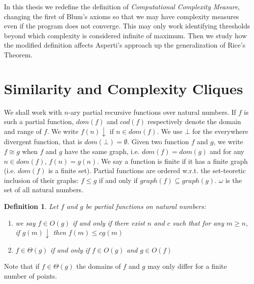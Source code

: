 \documentclass[10pt, a4paper, oneside, titlepage, draft]{article}
\newtheorem{definition}[shrd]{Definition}
\begin{document}
In this thesis we redefine the definition of \textit{Computational Complexity Measure}, changing the first of Blum's axioms so that we may have complexity measures even if the program does not converge. This may only work identifying thresholds beyond which complexity is considered infinite of maximum. Then we study how the modified definition affects Asperti's approach up the generalization of Rice's Theorem.

\section{Similarity and Complexity Cliques}
We shall work with $n$-ary partial recursive functions over natural numbers. If $f$ is such a partial function, $dom(f)$ and $cod(f)$ respectively denote the domain and range of $f$. We write $f(n)\downarrow$ if $n \in dom(f)$. We use $\bot$ for the everywhere divergent function, that is $dom(\bot) = \emptyset$. Given two function $f$ and $g$, we write $f \cong g$ when $f$ and $g$ have the same graph, i.e. $dom(f)=dom(g)$ and for any $n \in dom(f)$, $f(n)=g(n)$. We say a function is finite if it has a finite graph (i.e. $dom(f)$ is a finite set). Partial functions are ordered w.r.t. the set-teoretic inclusion of their graphs: $f \le g$ if and only if $graph(f) \subseteq graph(g)$. $\omega$ is the set of all natural numbers.

\begin{definition}
    Let $f$ and $g$ be partial functions on natural numbers:
    \begin{enumerate}
        \item we say $f \in O(g)$ if and only if there exist $n$ and $c$ such that for any $m \ge n$, if $g(m)\downarrow$ then $f(m) \le cg(m)$
        \item $f \in \Theta(g)$ if and only if $f \in O(g)$ and $g \in O(f)$
    \end{enumerate}
\end{definition}

Note that if $f \in \Theta(g)$ the domains of $f$ and $g$ may only differ for a finite number of points.
\end{document}
